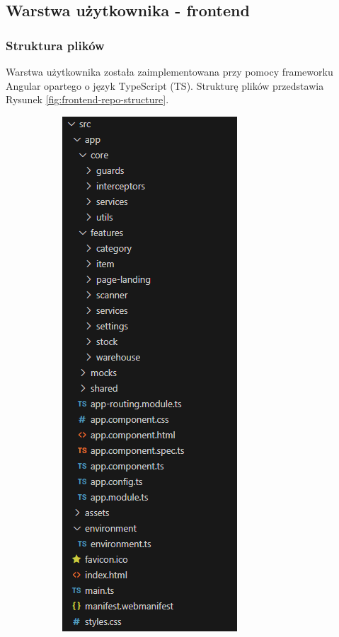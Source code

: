 \documentclass[../../main.tex]{subfiles}
\begin{document}
    \subsection{Warstwa użytkownika - frontend}

    \subsubsection{Struktura plików}
    Warstwa użytkownika została zaimplementowana przy pomocy frameworku Angular\cite{angular} opartego o język TypeScript (TS). Strukturę plików przedstawia Rysunek \ref{fig:frontend-repo-structure}.

    \begin{figure}[ht!]
        \begin{subfigure}{.5\textwidth}
            \centering
            \includegraphics[height=0.4\pdfpageheight]{images/front-repo-structure.png}

\end{subfigure}
\end{figure}
\end{document}
